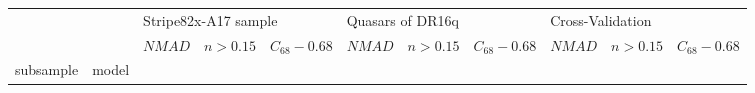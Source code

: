 \documentclass[fleqn,usenatbib]{mnras}
\begin{document}
\begin{table}
	\begin{tabular}{llrrrrrrrrr}
            \hline
                              &                  & \multicolumn{3}{l}{Stripe82x-A17 sample} & \multicolumn{3}{l}{Quasars of DR16q} & \multicolumn{3}{l}{Cross-Validation} \\
                              &                  &               $NMAD$ &        $n>0.15$ &  $C_{68} - 0.68$ &           $NMAD$ &        $n>0.15$ &  $C_{68} - 0.68$ &           $NMAD$ &        $n>0.15$ &  $C_{68} - 0.68$ \\
            subsample & model &                      &                 &                  &                  &                 &                  &                  &                 &                  \\


\end{tabular}
\end{table}
\end{document}
